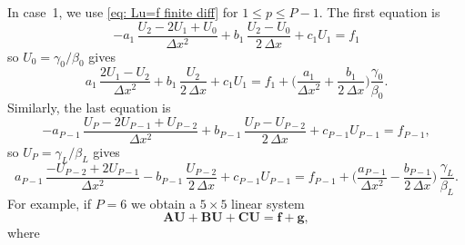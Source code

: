In case~1, we use \eqref{eq: Lu=f finite diff} for $1\le p\le P-1$.
The first equation is
\[
-a_1\,\frac{U_2-2U_1+U_0}{\Delta x^2}+b_1\,\frac{U_2-U_0}{2\,\Delta x}
	+c_1U_1=f_1
\]
so $U_0=\gamma_0/\beta_0$ gives
\[
a_1\,\frac{2U_1-U_2}{\Delta x^2}+b_1\,\frac{U_2}{2\,\Delta x}+c_1U_1
	=f_1+\biggl(\frac{a_1}{\Delta x^2}+\frac{b_1}{2\,\Delta x}\biggr)
	\frac{\gamma_0}{\beta_0}.
\]
Similarly, the last equation is
\[
-a_{P-1}\,\frac{U_P-2U_{P-1}+U_{P-2}}{\Delta x^2}
	+b_{P-1}\,\frac{U_P-U_{P-2}}{2\,\Delta x}+c_{P-1}U_{P-1}=f_{P-1},
\]
so $U_P=\gamma_L/\beta_L$ gives
\[
a_{P-1}\,\frac{-U_{P-2}+2U_{P-1}}{\Delta x^2}
	-b_{P-1}\,\frac{U_{P-2}}{2\,\Delta x}+c_{P-1}U_{P-1}
	=f_{P-1}+\biggl(\frac{a_{P-1}}{\Delta x^2}-\frac{b_{P-1}}{2\,\Delta x}
	\biggr)\,\frac{\gamma_L}{\beta_L}.
\]
For example, if $P=6$ we obtain a $5\times5$ linear system
\[
\boldsymbol{A}\boldsymbol{U}+\boldsymbol{B}\boldsymbol{U}
	+\boldsymbol{C}\boldsymbol{U}=\boldsymbol{f}+\boldsymbol{g},
\]
where
